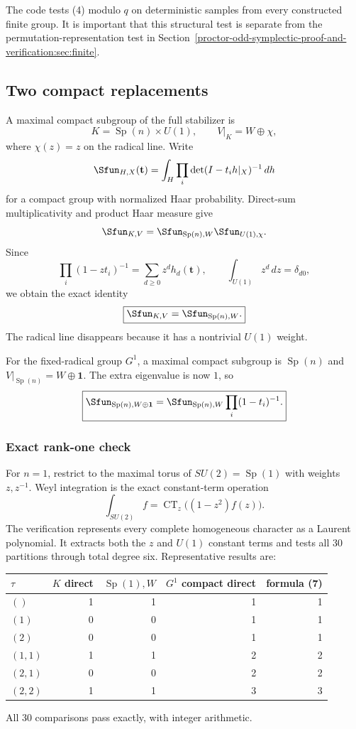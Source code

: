 \documentclass[10pt]{article}
\newcommand{\Sp}{\operatorname{Sp}}
\begin{document}
The code tests (4) modulo $q$ on deterministic samples from every constructed
finite group. It is important that this structural test is separate from the
permutation-representation test in Section~\ref{proctor-odd-symplectic-proof-and-verification:sec:finite}.

\subsection{Two compact replacements}

A maximal compact subgroup of the full stabilizer is
\[
 K=\Sp(n)\times U(1),\qquad V|_K=W\oplus\chi,
\]
where $\chi(z)=z$ on the radical line. Write
\[
 \Sfun_{H,X}(\mathbf t)=\int_H\prod_i\det(I-t_i h|_X)^{-1}\,dh
\]
for a compact group with normalized Haar probability. Direct-sum
multiplicativity and product Haar measure give
\[
 \Sfun_{K,V}=\Sfun_{\Sp(n),W}\Sfun_{U(1),\chi}.
\]
Since
\[
 \prod_i(1-zt_i)^{-1}=\sum_{d\ge0}z^d h_d(\mathbf t),
 \qquad \int_{U(1)}z^d\,dz=\delta_{d0},
\]
we obtain the exact identity
\begin{equation}
 \boxed{\Sfun_{K,V}=\Sfun_{\Sp(n),W}.}
\end{equation}
The radical line disappears because it has a nontrivial $U(1)$ weight.

For the fixed-radical group $G^1$, a maximal compact subgroup is $\Sp(n)$ and
$V|_{\Sp(n)}=W\oplus\mathbf 1$. The extra eigenvalue is now $1$, so
\begin{equation}
 \boxed{\Sfun_{\Sp(n),W\oplus\mathbf1}
 =\Sfun_{\Sp(n),W}\prod_i(1-t_i)^{-1}.}
\end{equation}

\subsubsection*{Exact rank-one check}

For $n=1$, restrict to the maximal torus of $SU(2)=\Sp(1)$ with weights
$z,z^{-1}$. Weyl integration is the exact constant-term operation
\[
 \int_{SU(2)}f=\operatorname{CT}_z\bigl((1-z^2)f(z)\bigr).
\]
The verification represents every complete homogeneous character as a Laurent
polynomial. It extracts both the $z$ and $U(1)$ constant terms and tests all 30
partitions through total degree six. Representative results are:
\begin{center}
\begin{tabular}{@{}lrrrr@{}}
\toprule
$\tau$ & $K$ direct & $\Sp(1),W$ & $G^1$ compact direct & formula (7)\\
\midrule
$()$      &1&1&1&1\\
$(1)$     &0&0&1&1\\
$(2)$     &0&0&1&1\\
$(1,1)$   &1&1&2&2\\
$(2,1)$   &0&0&2&2\\
$(2,2)$   &1&1&3&3\\
\bottomrule
\end{tabular}
\end{center}
All 30 comparisons pass exactly, with integer arithmetic.
\end{document}
